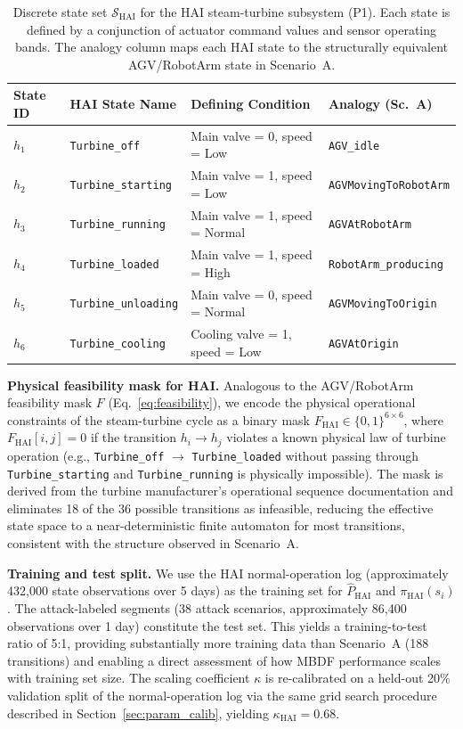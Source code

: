 \documentclass[manuscript,screen,review]{acmart}
\begin{document}
\begin{table}[!t]
\renewcommand{\arraystretch}{1.3}
\caption{Discrete state set $\mathcal{S}_{\mathrm{HAI}}$
for the HAI steam-turbine subsystem (P1). Each state is
defined by a conjunction of actuator command values and
sensor operating bands. The analogy column maps each HAI
state to the structurally equivalent AGV/RobotArm state in
Scenario~A.}
\label{tab:hai_states}
\centering
\small
\begin{tabular}{llll}
\toprule
\textbf{State ID} & \textbf{HAI State Name} &
\textbf{Defining Condition} &
\textbf{Analogy (Sc.~A)} \\
\midrule
$h_1$ & \texttt{Turbine\_off}
      & Main valve = 0, speed = Low
      & \texttt{AGV\_idle} \\
$h_2$ & \texttt{Turbine\_starting}
      & Main valve = 1, speed = Low
      & \texttt{AGVMovingToRobotArm} \\
$h_3$ & \texttt{Turbine\_running}
      & Main valve = 1, speed = Normal
      & \texttt{AGVAtRobotArm} \\
$h_4$ & \texttt{Turbine\_loaded}
      & Main valve = 1, speed = High
      & \texttt{RobotArm\_producing} \\
$h_5$ & \texttt{Turbine\_unloading}
      & Main valve = 0, speed = Normal
      & \texttt{AGVMovingToOrigin} \\
$h_6$ & \texttt{Turbine\_cooling}
      & Cooling valve = 1, speed = Low
      & \texttt{AGVAtOrigin} \\
\bottomrule
\end{tabular}
\end{table}

\textbf{Physical feasibility mask for HAI.}
Analogous to the AGV/RobotArm feasibility mask $F$
(Eq.~\eqref{eq:feasibility}), we encode the physical
operational constraints of the steam-turbine cycle as a
binary mask $F_{\mathrm{HAI}} \in \{0,1\}^{6\times 6}$,
where $F_{\mathrm{HAI}}[i,j] = 0$ if the transition
$h_i \to h_j$ violates a known physical law of turbine
operation (e.g., \texttt{Turbine\_off} $\to$
\texttt{Turbine\_loaded} without passing through
\texttt{Turbine\_starting} and \texttt{Turbine\_running}
is physically impossible). The mask is derived from the
turbine manufacturer's operational sequence documentation
and eliminates 18 of the 36 possible transitions as
infeasible, reducing the effective state space to a
near-deterministic finite automaton for most transitions,
consistent with the structure observed in Scenario~A.

\textbf{Training and test split.}
We use the HAI normal-operation log (approximately
432{,}000 state observations over 5 days) as the
training set for $\hat{P}_{\mathrm{HAI}}$ and
$\pi_{\mathrm{HAI}}(s_i)$. The attack-labeled segments
(38 attack scenarios, approximately 86{,}400 observations
over 1 day) constitute the test set. This yields a
training-to-test ratio of 5:1, providing substantially
more training data than Scenario~A (188 transitions)
and enabling a direct assessment of how MBDF performance
scales with training set size. The scaling coefficient
$\kappa$ is re-calibrated on a held-out 20\% validation
split of the normal-operation log via the same grid
search procedure described in Section~\ref{sec:param_calib},
yielding $\kappa_{\mathrm{HAI}} = 0.68$.
\end{document}

